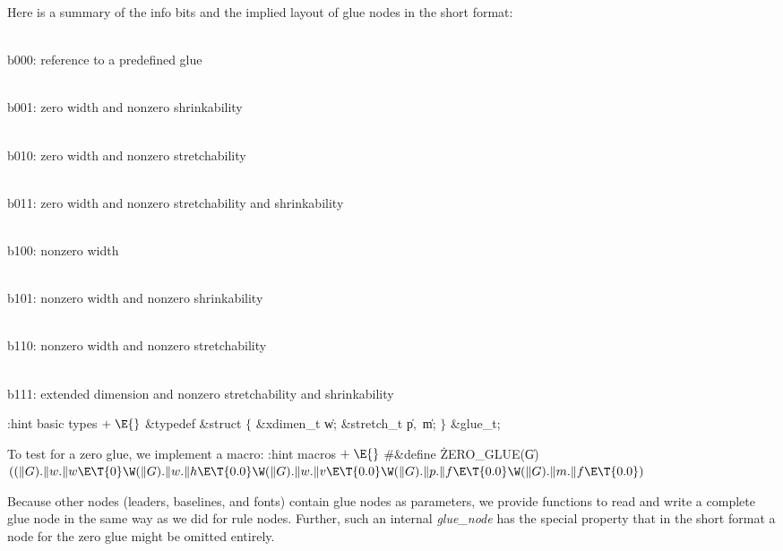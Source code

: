 
Here is a summary of the info bits and the implied layout
of glue nodes in the short format:
\itemize
\item \\{b000}: reference to a predefined glue
\item \\{b001}: zero width and nonzero shrinkability
\item \\{b010}: zero width and nonzero stretchability
\item \\{b011}: zero width and nonzero stretchability and  shrinkability
\item \\{b100}: nonzero width
\item \\{b101}: nonzero width and nonzero shrinkability
\item \\{b110}: nonzero width and nonzero stretchability
\item \\{b111}: extended dimension and nonzero stretchability and  shrinkability
\enditemize


\Y\B\4:hint basic types\X${}\mathrel+\E{}$\6
\&{typedef} \&{struct} ${}\{{}$\5
\1\&{xdimen\_t} \|w;\5
\&{stretch\_t} \|p${},{}$ \|m;\5
\2${}\}{}$ \&{glue\_t};
\Y
\fi



To test for a zero glue,
we implement a macro:
\Y\B\4:hint macros\X${}\mathrel+\E{}$\6
\8\#\&{define} \.{ZERO\_GLUE}(\|G)\5${}((\|G).\|w.\|w\E\T{0}\W(\|G).\|w.\|h\E\T{0.0}\W(\|G).\|w.\|v\E\T{0.0}\W(\|G).\|p.\|f\E\T{0.0}\W(\|G).\|m.\|f\E\T{0.0}){}$
\Y
\fi


Because other nodes (leaders, baselines, and fonts)
contain glue nodes as parameters, we provide functions
to read and write a complete glue node in the same way as we did
for rule nodes.
Further, such an internal {\sl glue\_node\/} has the special property that
in the short format a node for the zero glue might be omitted entirely.

